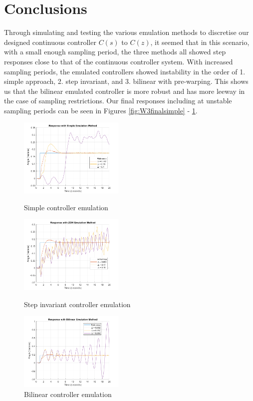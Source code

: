 \documentclass[11pt]{article}
\begin{document}
\section{Conclusions}
Through simulating and testing the various emulation methods to discretise our designed continuous controller $C(s)$ to $C(z)$, it seemed that in this scenario, with a small enough sampling period, the three methods all showed step responses close to that of the continuous controller system. With increased sampling periods, the emulated controllers showed instability in the order of 1. simple approach, 2. step invariant, and 3. bilinear with pre-warping. This shows us that the bilinear emulated controller is more robust and has more leeway in the case of sampling restrictions. Our final responses including at unstable sampling periods can be seen in Figures \ref{fig:W3finalsimple} - \ref{fig:W3finalbilinear}. \\

\begin{figure}[H]
\begin{minipage}{.3\textwidth}
    \centering
    \includegraphics[width=5cm]{final_simple_emulation.png}
    \caption{\small{Simple controller emulation}}
    \label{fig:W3finalsimple}
\end{minipage}
\hspace{0.5cm}
\begin{minipage}{.3\textwidth}
    \centering
    \includegraphics[width=5cm]{final_zoh_emulation.png}
    \caption{\small{Step invariant controller emulation}}
    \label{fig:W3finalzoh}
\end{minipage}
\hspace{0.5cm}
\begin{minipage}{.3\textwidth}
    \centering
    \includegraphics[width=5cm]{final_bilinear_emulation.png}
    \caption{\small{Bilinear controller emulation}}
    \label{fig:W3finalbilinear}
\end{minipage}
\end{figure}
\end{document}
